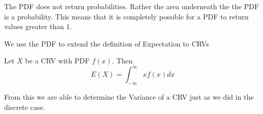 \begin{notsofast}
    The PDF does not return probabilities. Rather the area underneath the the PDF is a probability. This means that it is completely possible for a PDF to return values greater than 1.
\end{notsofast}

We use the PDF to extend the definition of Expectation to CRVs
\begin{definition}
Let $X$ be a CRV with PDF $f(x)$. Then
    \[
        E(X)=\int_{-\infty}^\infty x f(x) dx
    \]
\end{definition}
From this we are able to determine the Variance of a CRV just as we did in the discrete case.
